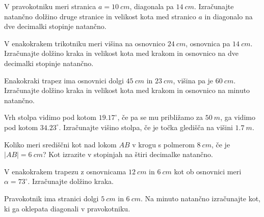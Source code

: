         


        
            \begin{naloga}
                V pravokotniku meri stranica $a=10~cm$, diagonala pa $14~cm$.
                Izračunajte natančno dolžino druge stranice in velikost kota med stranico $a$ in diagonalo na dve decimalki stopinje natančno.
            \end{naloga}


            \begin{naloga}
                V enakokrakem trikotniku meri višina na osnovnico $24~cm$, osnovnica pa $14~cm$.
                Izračunajte dolžino kraka in velikost kota med krakom in osnovnico na dve decimalki stopinje natančno.
            \end{naloga}


            \begin{naloga}
                Enakokraki trapez ima osnovnici dolgi $45~cm$ in $23~cm$, višina pa je $60~cm$.
                Izračunajte dolžino kraka in velikost kota med krakom in osnovnico na minuto natančno.
            \end{naloga}

            \begin{naloga}
                Vrh stolpa vidimo pod kotom $19.17^\circ$, če pa se mu približamo za $50~m$, ga vidimo pod kotom $34.23^\circ$.
                Izračunajte višino stolpa, če je točka gledišča na višini $1.7~m$.
            \end{naloga}

        


        
            \begin{naloga}
                Koliko meri središčni kot nad lokom $AB$ v krogu s polmerom $8~cm$, če je $\lvert AB \rvert=6~cm$?
                Kot izrazite v stopinjah na štiri decimalke natančno.
            \end{naloga}


            \begin{naloga}
                V enakokrakem trapezu z osnovnicama $12~cm$ in $6~cm$  kot ob osnovnici meri $\alpha=73^\circ$.
                Izračunajte dolžino kraka.
            \end{naloga}


            \begin{naloga}
                Pravokotnik ima stranici dolgi $5~cm$ in $6~cm$. Na minuto natančno izračunajte kot,
                ki ga oklepata diagonali v pravokotniku.
            \end{naloga}

